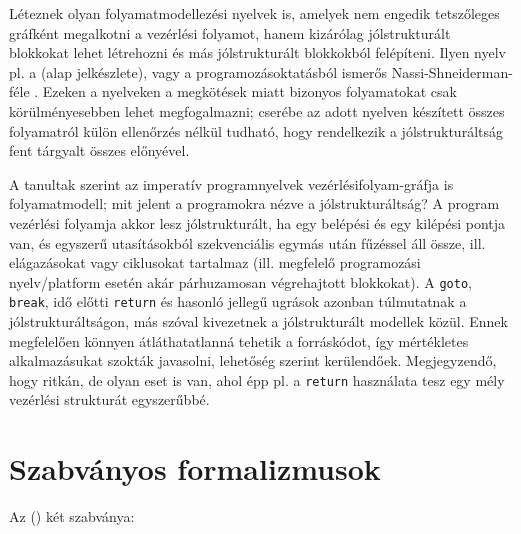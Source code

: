 Léteznek olyan folyamatmodellezési nyelvek is, amelyek nem engedik tetszőleges gráfként megalkotni a vezérlési folyamot, hanem kizárólag jólstrukturált blokkokat lehet létrehozni és más jólstrukturált blokkokból felépíteni. Ilyen nyelv pl. a  (alap jelkészlete), vagy a programozásoktatásból ismerős Nassi-Shneiderman-féle . Ezeken a nyelveken a megkötések miatt bizonyos folyamatokat csak körülményesebben lehet megfogalmazni; cserébe az adott nyelven készített összes folyamatról külön ellenőrzés nélkül tudható, hogy rendelkezik a jólstrukturáltság fent tárgyalt összes előnyével.

A tanultak szerint az imperatív programnyelvek vezérlésifolyam-gráfja is folyamatmodell; mit jelent a programokra nézve a jólstrukturáltság? A program vezérlési folyamja akkor lesz jólstrukturált, ha egy belépési és egy kilépési pontja van, és egyszerű utasításokból szekvenciális egymás után fűzéssel áll össze, ill. elágazásokat vagy ciklusokat tartalmaz (ill. megfelelő programozási nyelv/platform esetén akár párhuzamosan végrehajtott blokkokat). A \lstinline{goto}, \lstinline{break}, idő előtti \lstinline{return} és hasonló jellegű ugrások azonban túlmutatnak a jólstrukturáltságon, más szóval kivezetnek a jólstrukturált modellek közül.  Ennek megfelelően könnyen átláthatatlanná tehetik a forráskódot, így mértékletes alkalmazásukat szokták javasolni, lehetőség szerint kerülendőek. Megjegyzendő, hogy ritkán, de olyan eset is van, ahol épp pl. a \lstinline{return} használata tesz egy mély vezérlési strukturát egyszerűbbé. 

% 
% 

% 
% 
% 
% 
% 
% 


\section{Szabványos formalizmusok\kieg}

Az  () két szabványa:

